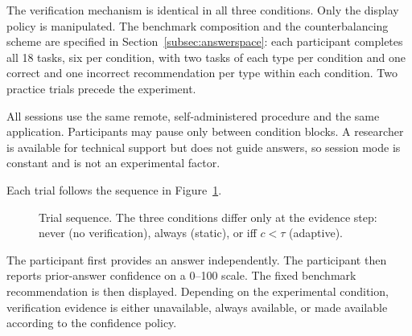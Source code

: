 \documentclass[oneside,final,14pt,a4paper]{extreport}
\begin{document}
The verification mechanism is identical in all three conditions. Only the
display policy is manipulated. The benchmark composition and the
counterbalancing scheme are specified in Section~\ref{subsec:answerspace}: each
participant completes all 18 tasks, six per condition, with two tasks of each
type per condition and one correct and one incorrect recommendation per type
within each condition. Two practice trials precede the experiment.

All sessions use the same remote, self-administered procedure and the same
application. Participants may pause only between condition blocks. A researcher
is available for technical support but does not guide answers, so session mode
is constant and is not an experimental factor.

Each trial follows the sequence in Figure~\ref{fig:trial}.

\begin{figure}[t]
\centering
{}
\caption{Trial sequence. The three conditions differ only at the evidence
step: never (no verification), always (static), or iff $c<\tau$ (adaptive).}
\label{fig:trial}
\end{figure}

The participant first provides an answer independently. The participant then
reports prior-answer confidence on a 0--100 scale. The fixed benchmark
recommendation is then displayed. Depending on the experimental condition,
verification evidence is either unavailable, always available, or made
available according to the confidence policy.
\end{document}
